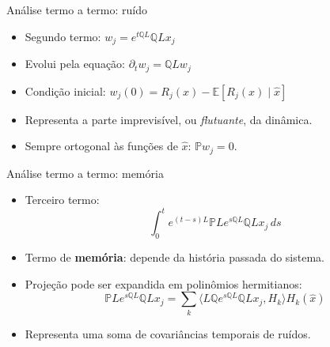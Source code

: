 \begin{frame}{Análise termo a termo: ruído}
\begin{itemize}
    \item Segundo termo: $w_j = e^{t\mathbb{Q}L} \mathbb{Q}L x_j$
    \item Evolui pela equação: $\partial_t w_j = \mathbb{Q}L w_j$
    \item Condição inicial: $w_j(0) = R_j(x) - \mathbb{E}[R_j(x) \mid \hat{x}]$
    \item Representa a parte imprevisível, ou \textit{flutuante}, da dinâmica.
    \item Sempre ortogonal às funções de $\hat{x}$: $\mathbb{P}w_j = 0$.
\end{itemize}
\end{frame}

\begin{frame}{Análise termo a termo: memória}
\begin{itemize}
    \item Terceiro termo:
    \begin{equation*}
        \int_0^t e^{(t-s)L} \mathbb{P}L e^{s\mathbb{Q}L} \mathbb{Q}L x_j \, ds
    \end{equation*}
    \item Termo de \textbf{memória}: depende da história passada do sistema.
    \item Projeção pode ser expandida em polinômios hermitianos:
    \begin{equation*}
        \mathbb{P}L e^{s\mathbb{Q}L} \mathbb{Q}Lx_j = \sum_k \langle L \mathbb{Q} e^{s\mathbb{Q}L} \mathbb{Q}Lx_j, H_k \rangle H_k(\hat{x})
    \end{equation*}
    \item Representa uma soma de covariâncias temporais de ruídos.
\end{itemize}
\end{frame}